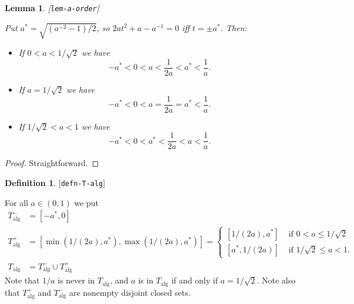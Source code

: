 \documentclass[reqno]{amsart}
\newcommand{\lbl}[1]{\label{#1}\textup{[\texttt{#1}]}\par}
\newcommand{\lbl}{\label}
\newcommand{\alg}	{\operatorname{alg}}
\newcommand{\rt}        {\sqrt{2}}
\renewcommand{\:}{\colon}
\newtheorem{lemma}[theorem]{Lemma}
\theoremstyle{definition}
\newtheorem{definition}[theorem]{Definition}
\begin{document}
\begin{lemma}\lbl{lem-a-order}
 Put $a^*=\sqrt{(a^{-2}-1)/2}$, so $2at^2+a-a^{-1}=0$ iff $t=\pm a^*$.
 Then:
 \begin{itemize}
  \item If $0<a<1/\rt$ we have
   \[ -a^* < 0 < a < \frac{1}{2a} < a^* < \frac{1}{a}.  \]
  \item If $a=1/\rt$ we have
   \[ -a^* < 0 < a = \frac{1}{2a} = a^* < \frac{1}{a}. \]
  \item If $1/\rt<a<1$ we have
   \[ -a^* < 0 < a^* < \frac{1}{2a} < a < \frac{1}{a}. \]
 \end{itemize}
\end{lemma}
\begin{proof}
 Straightforward.
\end{proof}

\begin{definition}\lbl{defn-T-alg}
 For all $a\in(0,1)$ we put
 \begin{align*}
  T_{\alg}^- &= [-a^*,0] \\
  T_{\alg}^+ &= [\min(1/(2a),a^*),\max(1/(2a),a^*)]
    = \begin{cases}
       [1/(2a),a^*] & \text{ if } 0 < a \leq 1/\rt \\
       [a^*,1/(2a)] & \text{ if } 1/\rt \leq a < 1.
      \end{cases} \\
  T_{\alg} &= T_{\alg}^- \cup T_{\alg}^+
 \end{align*}
 Note that $1/a$ is never in $T_{\alg}$, and $a$ is in $T_{\alg}$ if
 and only if $a=1/\rt$.  Note also that $T_{\alg}^+$ and
 $T_{\alg}^-$ are nonempty disjoint closed sets.
\end{definition}
\end{document}
